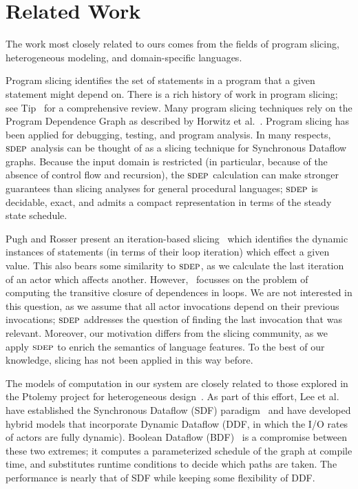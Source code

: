 \section{Related Work}

The work most closely related to ours comes from the fields of program
slicing, heterogeneous modeling, and domain-specific languages.

Program slicing identifies the set of statements in a program that a
given statement might depend on.  There is a rich history of work in
program slicing; see Tip~\cite{tip95slice} for a comprehensive review.
Many program slicing techniques rely on the Program Dependence Graph
as described by Horwitz et al.~\cite{hrb88pdg}.  Program slicing has
been applied for debugging, testing, and program analysis.  In many
respects, $\textsc{sdep}$ analysis can be thought of as a slicing technique
for Synchronous Dataflow graphs.  Because the input domain is
restricted (in particular, because of the absence of control flow and
recursion), the $\textsc{sdep}$ calculation can make stronger guarantees than
slicing analyses for general procedural languages; $\textsc{sdep}$ is
decidable, exact, and admits a compact representation in terms of the
steady state schedule.

Pugh and Rosser present an iteration-based slicing~\cite{pughslice}
which identifies the dynamic instances of statements (in terms of
their loop iteration) which effect a given value.  This also bears
some similarity to $\textsc{sdep}$, as we calculate the last iteration of an
actor which affects another.  However,~\cite{pughslic} focusses on the
problem of computing the transitive closure of dependences in loops.
We are not interested in this question, as we assume that all actor
invocations depend on their previous invocations; $\textsc{sdep}$ addresses
the question of finding the last invocation that was relevant.
Moreover, our motivation differs from the slicing community, as we
apply $\textsc{sdep}$ to enrich the semantics of language features.  To the
best of our knowledge, slicing has not been applied in this way
before.

The models of computation in our system are closely related to those
explored in the Ptolemy project for heterogeneous
design~\cite{ptolemy03overview}.  As part of this effort, Lee et
al. have established the Synchronous Dataflow (SDF)
paradigm~\cite{LM87-i} and have developed hybrid models that
incorporate Dynamic Dataflow (DDF, in which the I/O rates of actors
are fully dynamic).  Boolean Dataflow (BDF)~\cite{ha97profile} is a
compromise between these two extremes; it computes a parameterized
schedule of the graph at compile time, and substitutes runtime
conditions to decide which paths are taken.  The performance is nearly
that of SDF while keeping some flexibility of DDF.  

